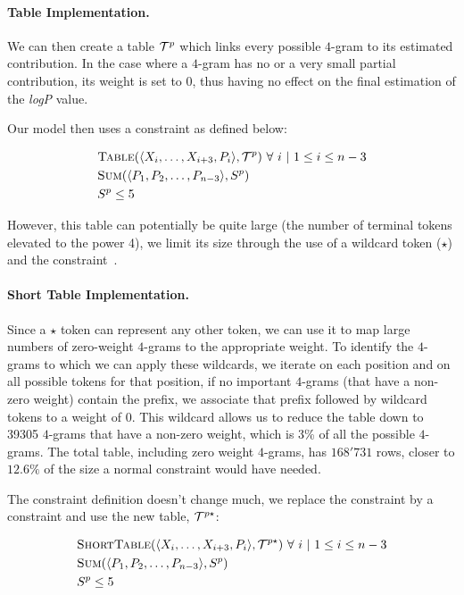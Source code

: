 \documentclass[../Document.tex]{subfiles}
\begin{document}
\paragraph{Table Implementation.}
We can then create a table ${\cal T}^p$ which links every possible $4$-gram to its estimated contribution.
In the case where a $4$-gram has no or a very small partial contribution, its weight is set to 0, thus having no effect on the final estimation of the \emph{logP} value.

Our model then uses a \extensional constraint as defined below:

\begin{align*}
    &\mbox{\sc Table}(\langle X_i,\ldots,X_{i+3},P_i\rangle, {\cal T}^p)\ \forall\ i\ \vert\ 1 \leq i \leq n-3 \\
    &\mbox{\sc Sum}(\langle P_1, P_2,\ldots,P_{n-3} \rangle, S^p)\\
    &S^p \leq 5
\end{align*}

However, this table can potentially be quite large (the number of terminal tokens elevated to the power 4), we limit its size through the use of a wildcard token ($\star$) and the \shortTable constraint~\cite{DBLP:conf/aaai/VerhaegheLS17}.

\paragraph{Short Table Implementation.}
Since a $\star$ token can represent any other token, we can use it to map large numbers of zero-weight $4$-grams to the appropriate weight.
To identify the $4$-grams to which we can apply these wildcards, we iterate on each position and on all possible tokens for that position, if no important $4$-grams (that have a non-zero weight) contain the prefix, we associate that prefix followed by wildcard tokens to a weight of 0.
This wildcard allows us to reduce the table down to 39305 $4$-grams that have a non-zero weight, which is 3\% of all the possible $4$-grams. The total table, including zero weight $4$-grams, has $168'731$ rows, closer to $12.6\%$ of the size a normal \extensional constraint would have needed.

The constraint definition doesn't change much, we replace the \extensional constraint by a\\ \shortTable constraint and use the new table, ${\cal T}^{p\star}$:

\begin{align*}
    &\mbox{\sc ShortTable}(\langle X_i,\ldots,X_{i+3},P_i\rangle, {\cal T}^{p\star})\ \forall\ i\ \vert\ 1 \leq i \leq n-3 \\
    &\mbox{\sc Sum}(\langle P_1, P_2,\ldots,P_{n-3} \rangle, S^p)\\
    &S^p \leq 5
\end{align*}
\end{document}

